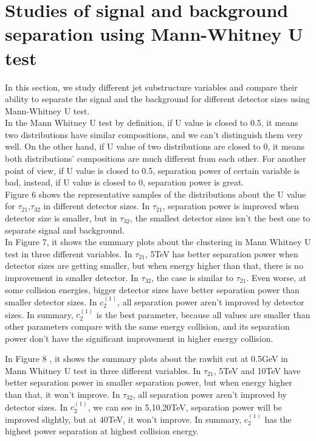 \section{Studies of signal and background separation using Mann-Whitney U test}
In this section, we study different jet substructure variables and compare their ability to separate the signal and the background for different detector sizes using Mann-Whitney U test.\\

In the Mann Whitney U test by definition, if U value is closed to 0.5, it means two distributions have similar compositions, and we can't distinguish them very well. On the other hand, if U value of two distributions are closed to 0, it means both distributions' compositions are much different from each other. For another point of view, if U value is closed to 0.5, separation power of certain variable is bad, instead, if U value is closed to 0, separation power is great.\\

Figure 6 shows the representative samples of the distributions about the U value for $\tau_{21}$,$\tau_{32}$ in different detector sizes. In $\tau_{21}$, separation power is improved when detector size is smaller, but in $\tau_{32}$, the smallest detector sizes isn't the best one to separate signal and background.\\

In Figure 7, it shows the summary plots about the clustering in Mann Whitney U test in three different variables. In $\tau_{21}$, 5TeV has better separation power when detector sizes are getting smaller, but when energy higher than that, there is no improvement in smaller detector. In $\tau_{32}$, the case is similar to  $\tau_{21}$. Even worse, at some collision energies, bigger detector sizes have better separation power than smaller detector sizes. In $c_2^{(1)}$, all separation power aren't improved by detector sizes.  In summary, $c_2^{(1)}$ is the best parameter, because all values are smaller than other parameters compare with the same energy collision, and its separation power don't have the significant improvement in higher energy collision.

In Figure 8 , it shows the summary plots about the rawhit cut at 0.5GeV in Mann Whitney U test in three different variables. In $\tau_{21}$, 5TeV and 10TeV have better separation power in smaller separation power, but when energy higher than that, it won't improve.  In $\tau_{32}$, all separation power aren't improved by detector sizes. In $c_2^{(1)}$, we can see in 5,10,20TeV, separation power will be improved slightly, but at 40TeV, it won't improve. In summary, $c_2^{(1)}$ has the highest power separation at highest collision energy.

